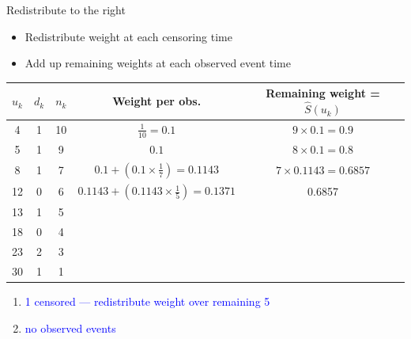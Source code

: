 \documentclass[10pt,t]{beamer}
\begin{document}
\begin{frame}{Redistribute to the right}
	\begin{itemize}
		\item Redistribute weight at each censoring time
		\item Add up remaining weights at each observed event time
	\end{itemize}
	\begin{footnotesize}
		\begin{tabular}{|c|c|c|c|c|}
			\hline
			$u_k$ & $d_k$ & $n_k$ & Weight per obs. & Remaining weight = $\widehat{S}(u_k)$ \\
			\hline
			4 & 1 & 10 & $\frac{1}{10} = 0.1$ & $9\times 0.1= 0.9$\\
			5 & 1 & 9 & $0.1$ &  $8\times 0.1= 0.8$  \\
			8 & 1 & 7 & $0.1 + (0.1\times \frac{1}{7}) = 0.1143$ & $7 \times 0.1143 = 0.6857$\\
			12 & 0 & 6 & $0.1143 +  (0.1143\times\frac{1}{5}) = 0.1371$ &  0.6857\\
			13 & 1 & 5 & & \\
			18 & 0 & 4 & & \\
			23 & 2 & 3 & & \\
			30 & 1 & 1 & & \\
			\hline
		\end{tabular}
	\end{footnotesize}
	\begin{enumerate}
		\item \textcolor{blue}{1 censored --- redistribute weight over remaining 5}
		\item \textcolor{blue}{no observed events}
	\end{enumerate}
\end{frame}
\end{document}
